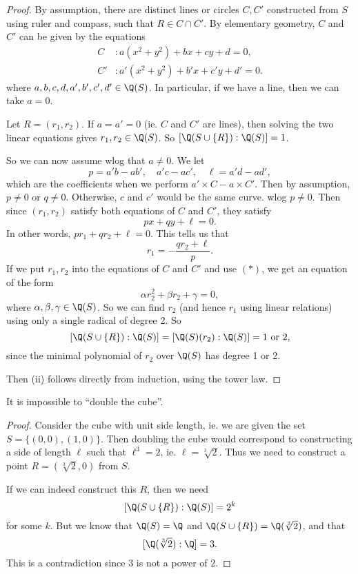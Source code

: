 \documentclass[a4paper]{article}
\begin{document}
\begin{proof}
  By assumption, there are distinct lines or circles $C, C'$ constructed from $S$ using ruler and compass, such that $R\in C\cap C'$. By elementary geometry, $C$ and $C'$ can be given by the equations
  \begin{align*}
    C&: a(x^2 + y^2) + bx + cy + d = 0,\\
    C'&: a'(x^2 + y^2) + b'x + c'y + d' = 0.
  \end{align*}
  where $a, b, c, d, a', b', c', d' \in \Q(S)$. In particular, if we have a line, then we can take $a = 0$.

  Let $R = (r_1, r_2)$. If $a = a' = 0$ (ie. $C$ and $C'$ are lines), then solving the two linear equations gives $r_1, r_2 \in \Q(S)$. So $[\Q(S\cup \{R\}):\Q(S)] = 1$.

  So we can now assume wlog that $a\not = 0$. We let
  \[
    p = a'b - ab',\quad a'c - ac',\quad \ell = a'd - ad',
  \]
  which are the coefficients when we perform $a'\times C - a \times C'$. Then by assumption, $p \not= 0$ or $q \not= 0$. Otherwise, $c$ and $c'$ would be the same curve. wlog $p \not= 0$. Then since $(r_1, r_2)$ satisfy both equations of $C$ and $C'$, they satisfy
  \[
    px + qy + \ell = 0.
  \]
  In other words, $pr_1 + qr_2 + \ell = 0$. This tells us that
  \[
    r_1 = -\frac{qr_2 + \ell}{p}.\tag{$*$}
  \]
  If we put $r_1, r_2$ into the equations of $C$ and $C'$ and use $(*)$, we get an equation of the form
  \[
    \alpha r_2^2 + \beta r_2 + \gamma = 0,
  \]
  where $\alpha, \beta, \gamma \in \Q(S)$. So we can find $r_2$ (and hence $r_1$ using linear relations) using only a single radical of degree 2. So
  \[
    [\Q(S\cup \{R\}):\Q(S)] = [\Q(S)(r_2): \Q(S)] = 1\text{ or }2,
  \]
  since the minimal polynomial of $r_2$ over $\Q(S)$ has degree 1 or 2.

  Then (ii) follows directly from induction, using the tower law.
\end{proof}

\begin{cor}
  It is impossible to ``double the cube''.
\end{cor}

\begin{proof}
  Consider the cube with unit side length, ie. we are given the set $S = \{(0, 0), (1, 0)\}$. Then doubling the cube would correspond to constructing a side of length $\ell$ such that $\ell^3 = 2$, ie. $\ell = \sqrt[3]{2}$. Thus we need to construct a point $R = (\sqrt[3]{2}, 0)$ from $S$.

  If we can indeed construct this $R$, then we need
  \[
    [\Q(S\cup \{R\}):\Q(S)] = 2^k
  \]
  for some $k$. But we know that $\Q(S) = \Q$ and $\Q(S\cup \{R\}) = \Q(\sqrt[3]{2})$, and that
  \[
    [\Q(\sqrt[3]{2}):\Q] = 3.
  \]
  This is a contradiction since $3$ is not a power of $2$.
\end{proof}
\end{document}
